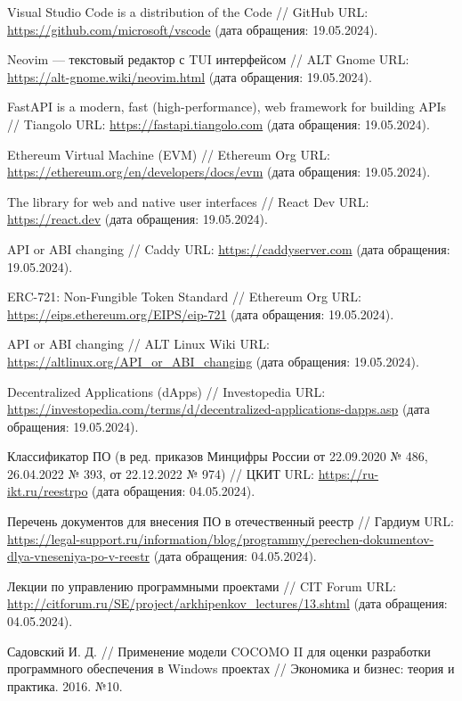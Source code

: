 \begin{thebibliography}{99\kern\bibindent}
	 Visual Studio Code is a distribution of the Code // GitHub URL: \url{https://github.com/microsoft/vscode} (дата обращения: 19.05.2024).

	 Neovim — текстовый редактор с TUI интерфейсом // ALT Gnome URL: \url{https://alt-gnome.wiki/neovim.html} (дата обращения: 19.05.2024).

	 FastAPI is a modern, fast (high-performance), web framework for building APIs // Tiangolo URL: \url{https://fastapi.tiangolo.com} (дата обращения: 19.05.2024).

	 Ethereum Virtual Machine (EVM) // Ethereum Org URL: \url{https://ethereum.org/en/developers/docs/evm} (дата обращения: 19.05.2024).

	 The library for web and native user interfaces // React Dev URL: \url{https://react.dev} (дата обращения: 19.05.2024).

	 API or ABI changing // Caddy URL: \url{https://caddyserver.com} (дата обращения: 19.05.2024).

	 ERC-721: Non-Fungible Token Standard // Ethereum Org URL: \url{https://eips.ethereum.org/EIPS/eip-721} (дата обращения: 19.05.2024).

	 API or ABI changing // ALT Linux Wiki URL: \url{https://altlinux.org/API_or_ABI_changing} (дата обращения: 19.05.2024).

	 Decentralized Applications (dApps) // Investopedia URL: \url{https://investopedia.com/terms/d/decentralized-applications-dapps.asp} (дата обращения: 19.05.2024).

	 Классификатор ПО (в ред. приказов Минцифры России от 22.09.2020 № 486, 26.04.2022 № 393, от 22.12.2022 № 974) // ЦКИТ URL: \url{https://ru-ikt.ru/reestrpo} (дата обращения: 04.05.2024).

	 Перечень документов для внесения ПО в отечественный реестр // Гардиум URL: \url{https://legal-support.ru/information/blog/programmy/perechen-dokumentov-dlya-vneseniya-po-v-reestr} (дата обращения: 04.05.2024).

	 Лекции по управлению программными проектами // CIT Forum URL: \url{http://citforum.ru/SE/project/arkhipenkov_lectures/13.shtml} (дата обращения: 04.05.2024).

	 Садовский И. Д. // Применение модели COCOMO II для оценки разработки программного обеспечения в Windows проектах // Экономика и бизнес: теория и практика. 2016. №10. %


\end{thebibliography}
